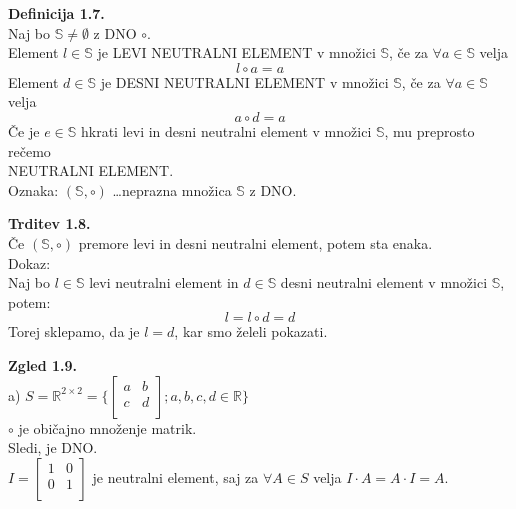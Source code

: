 \documentclass[12pt]{article}
\begin{document}
\vspace*{24pt}


\noindent
\textbf{Definicija 1.7.} \\
Naj bo $\mathbb{S} \ne \emptyset$ z DNO $\circ$. \\
Element $l \in \mathbb{S}$ je LEVI NEUTRALNI ELEMENT v množici $\mathbb{S}$, če za $\forall a \in \mathbb{S}$ velja
$$l \circ a = a$$
Element $d \in \mathbb{S}$ je DESNI NEUTRALNI ELEMENT v množici $\mathbb{S}$, če za $\forall a \in \mathbb{S}$ velja
$$a \circ d = a$$
Če je $e \in \mathbb{S}$ hkrati levi in desni neutralni element v množici $\mathbb{S}$, mu preprosto rečemo \\
NEUTRALNI ELEMENT. \\
Oznaka: $(\mathbb{S}, \circ)$ \dots neprazna množica $\mathbb{S}$ z DNO.


\vspace*{24pt}


\noindent
\textbf{Trditev 1.8.} \\
Če $(\mathbb{S}, \circ)$ premore levi in desni neutralni element, potem sta enaka. \\
Dokaz: \\
Naj bo $l \in \mathbb{S}$ levi neutralni element in $d \in \mathbb{S}$ desni neutralni element v množici $\mathbb{S}$, potem:
$$l = l \circ d = d$$
Torej sklepamo, da je $l = d$, kar smo želeli pokazati.



\vspace*{24pt}


\noindent
\textbf{Zgled 1.9.} \\

\noindent
a) $S = \mathbb{R}^{2 \times 2} = \{ 
    \begin{bmatrix} 
        a & b \\
        c & d \\
    \end{bmatrix}
    ; a, b, c, d \in \mathbb{R}
\}$ \\
\hspace*{1em} $\circ$ je običajno množenje matrik. \\
\hspace*{1em} Sledi, je DNO.\\
\hspace*{1em} $I = \begin{bmatrix}
    1 & 0 \\
    0 & 1 \\
\end{bmatrix}$ je neutralni element, saj za $\forall A \in S$ velja $I \cdot A = A \cdot I = A$. \\
\end{document}
